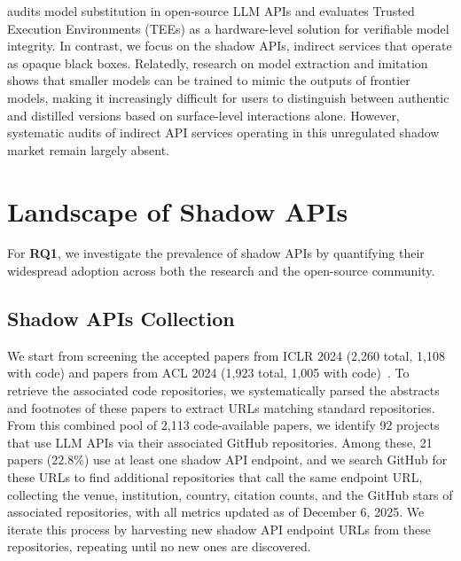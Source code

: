 \documentclass[letterpaper,twocolumn,10pt]{article}
\begin{document}
\cite{CSZS25} audits model substitution in open-source LLM APIs and evaluates Trusted Execution Environments (TEEs) as a hardware-level solution for verifiable model integrity.
In contrast, we focus on the shadow APIs, indirect services that operate as opaque black boxes. 
Relatedly, research on model extraction and imitation~\cite{KTPPI19} shows that smaller models can be trained to mimic the outputs of frontier models, making it increasingly difficult for users to distinguish between authentic and distilled versions based on surface-level interactions alone.
However, systematic audits of indirect API services operating in this unregulated shadow market remain largely absent.

\section{Landscape of Shadow APIs}
\label{section:academia}
For \textbf{RQ1}, we investigate the prevalence of shadow APIs by quantifying their widespread adoption across both the research and the open-source community.

\subsection{Shadow APIs Collection}
We start from screening the accepted papers from ICLR 2024 (2{,}260 total, 1{,}108 with code) and papers from ACL 2024 (1{,}923 total, 1{,}005 with code)~\cite{I24,A24}. 
To retrieve the associated code repositories, we systematically parsed the abstracts and footnotes of these papers to extract URLs matching standard repositories.
From this combined pool of 2,113 code-available papers, we identify 92 projects that use LLM APIs via their associated GitHub repositories.
Among these, 21 papers ($22.8\%$) use at least one shadow API endpoint, and we search GitHub for these URLs to find additional repositories that call the same endpoint URL, collecting the venue, institution, country, citation counts, and the GitHub stars of associated repositories, with all metrics updated as of December 6, 2025. 
We iterate this process by harvesting new shadow API endpoint URLs from these repositories, repeating until no new ones are discovered. 
\end{document}
